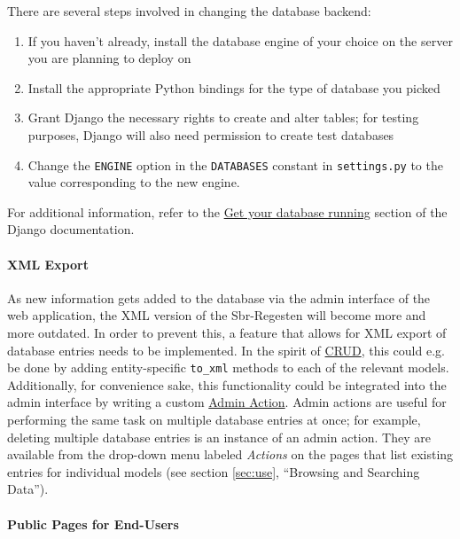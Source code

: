 There are several steps involved in changing the database backend:

\begin{enumerate}
\item If you haven't already, install the database engine of your
  choice on the server you are planning to deploy on
\item Install the appropriate Python bindings for the type of database
  you picked
\item Grant Django the necessary rights to create and alter tables;
  for testing purposes, Django will also need permission to create
  test databases
\item Change the \texttt{ENGINE} option in the \texttt{DATABASES}
  constant in \texttt{settings.py} to the value corresponding to the
  new engine.
\end{enumerate}

For additional information, refer to the
\href{https://docs.djangoproject.com/en/1.4/topics/install/#database-installation}{Get
your database running} section of the Django documentation.

\paragraph{XML Export}

As new information gets added to the database via the admin interface
of the web application, the XML version of the Sbr-Regesten will
become more and more outdated. In order to prevent this, a feature
that allows for XML export of database entries needs to be
implemented. In the spirit of
\href{https://en.wikipedia.org/wiki/CRUD}{CRUD}, this could e.g. be
done by adding entity-specific \texttt{to\_xml} methods to each of the
relevant models. Additionally, for convenience sake, this
functionality could be integrated into the admin interface by writing
a custom
\href{https://docs.djangoproject.com/en/1.4/ref/contrib/admin/actions/}{Admin
  Action}. Admin actions are useful for performing the same task on
multiple database entries at once; for example, deleting multiple
database entries is an instance of an admin action. They are available
from the drop-down menu labeled \emph{Actions} on the pages that list
existing entries for individual models (see section \ref{sec:use},
``Browsing and Searching Data'').

\paragraph{Public Pages for End-Users}

